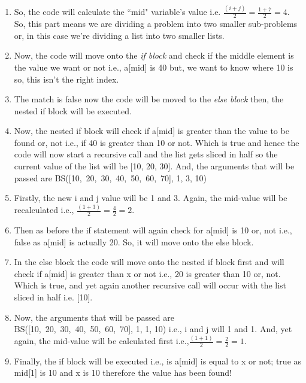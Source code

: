 \documentclass[a4paper,12pt]{article}
\theoremstyle{definition}
\begin{document}
    \begin{enumerate}
        \item So, the code will calculate the ``mid" variable's value i.e. $\frac{(i + j)}{2} = \frac{1 + 7}{2} = 4$.
        So, this part means we are dividing a problem into two smaller sub-problems or, in this case we're
        dividing a list into two smaller lists.
        \item Now, the code will move onto the \textit{if block} and check if the middle element is the value we want
        or not i.e., a[mid] is 40 but, we want to know where 10 is so, this isn't the right index.
        \item The match is false now the code will be moved to the \textit{else block} then, the nested
        if block will be executed.
        \item Now, the nested if block will check if a[mid] is greater than the value to be found or, not i.e., if 40
        is greater than 10 or not.
        Which is true and hence the code will now start a recursive call and the list gets sliced in half so the
        current value of the list will be [10, 20, 30].
        And, the arguments that will be passed are BS([10,~20,~30,~40,~50,~60,~70], 1, 3, 10)
        \item Firstly, the new i and j value will be 1 and 3.
        Again, the mid-value will be recalculated i.e., $\frac{(1 + 3)}{2} = \frac{4}{2} = 2$.
        \item Then as before the if statement will again check for a[mid] is 10 or, not i.e., false as a[mid] is
        actually 20.
        So, it will move onto the else block.
        \item In the else block the code will move onto the nested if block first and will check if a[mid] is greater
        than x or not i.e., 20 is greater than 10 or, not. Which is true, and yet again another recursive call
        will occur with the list sliced in half i.e. [10].
        \item Now, the arguments that will be passed are\\ BS([10,~20,~30,~40,~50,~60,~70], 1, 1, 10) i.e., i and j
        will 1 and 1.
        And, yet again, the mid-value will be calculated first i.e.,$\frac{(1 + 1)}{2} = \frac{2}{2} = 1$.
        \item Finally, the if block will be executed i.e., is a[mid] is equal to x or not; true as mid[1] is 10 and
        x is 10 therefore the value has been found!
    \end{enumerate}
\end{document}
